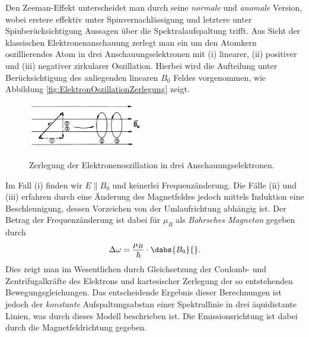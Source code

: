 Den Zeeman-Effekt unterscheidet man durch seine \emph{normale} und \emph{anomale} Version, wobei erstere effektiv unter Spinvernachlässigung und letztere unter Spinberücksichtigung Aussagen über die Spektralaufspaltung trifft. Aus Sicht der klassischen Elektronenanschauung zerlegt man ein um den Atomkern oszillierendes Atom in drei Anschauungselektronen mit (i) linearer, (ii) positiver und (iii) negativer zirkularer Oszillation. Hierbei wird die Aufteilung unter Berücksichtigung des anliegenden linearen $B_0$ Feldes vorgenommen, wie Abbildung \ref{fig:ElektronOszillationZerlegung} zeigt. 
\begin{figure}[H]
	\centering
	\includegraphics[width=5cm]{../../Bilddateien/Grundlagen/ElektronOszillationZerlegung.png}
	\label{fig:ElektronenOszillationZerlegung}
	\caption{Zerlegung der Elektronenoszillation in drei Anschauungselektronen.}
\end{figure}
Im Fall (i) finden wir $E\parallel B_0$ und keinerlei Frequenzänderung. Die Fälle (ii) und (iii) erfahren durch eine Änderung des Magnetfeldes jedoch mittels Induktion eine Beschleunigung, dessen Vorzeichen von der Umlaufrichtung abhängig ist. Der Betrag der Frequenzänderung ist dabei für $\mu_B$ als \emph{Bohrsches Magneton} gegeben durch 
\[
	\Delta\omega = \frac{\mu_B}{\hbar}\cdot\dabs{B_0}{}.
\]
Dies zeigt man im Wesentlichen durch Gleichsetzung der Coulomb- und Zentrifugalkräfte des Elektrons und kartesischer Zerlegung der so entstehenden Bewegungsgleichungen. Das entscheidende Ergebnis dieser Berechnungen ist jedoch der \emph{konstante} Aufspaltungsabstan einer Spektrallinie in drei äquidistante Linien, was durch dieses Modell beschrieben ist. Die Emissionsrichtung ist dabei durch die Magnetfeldrichtung gegeben. 
